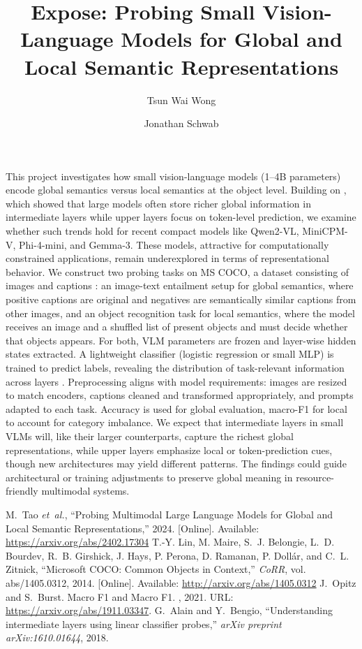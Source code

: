 \documentclass[12pt,a4paper]{article}
\title{\textbf{Expose: Probing Small Vision-Language Models for Global and Local Semantic Representations}}
\author{Tsun Wai Wong \and Jonathan Schwab}
\date{}
\begin{document}
\maketitle
\noindent
This project investigates how small vision-language models (1--4B parameters) encode global semantics versus local semantics at the object level. Building on \cite{tao2024probingmultimodallargelanguage}, which showed that large models often store richer global information in intermediate layers while upper layers focus on token-level prediction, we examine whether such trends hold for recent compact models like Qwen2-VL, MiniCPM-V, Phi-4-mini, and Gemma-3. These models, attractive for computationally constrained applications, remain underexplored in terms of representational behavior.
We construct two probing tasks on MS COCO, a dataset consisting of images and captions \cite{lin2014microsoft}: an image-text entailment setup for global semantics, where positive captions are original and negatives are semantically similar captions from other images, and an object recognition task for local semantics, where the model receives an image and a shuffled list of present objects and must decide whether that objects appears. For both, VLM parameters are frozen and layer-wise hidden states extracted. A lightweight classifier (logistic regression or small MLP) is trained to predict labels, revealing the distribution of task-relevant information across layers \cite{alain2018understanding}. Preprocessing aligns with model requirements: images are resized to match encoders, captions cleaned and transformed appropriately, and prompts adapted to each task. Accuracy is used for global evaluation, macro-F1 \cite{opitz2021macrof1} for local to account for category imbalance.
We expect that intermediate layers in small VLMs will, like their larger counterparts, capture the richest global representations, while upper layers emphasize local or token-prediction cues, though new architectures may yield different patterns. The findings could guide architectural or training adjustments to preserve global meaning in resource-friendly multimodal systems.

\begin{thebibliography}{1}
M.~Tao \emph{et~al.}, ``Probing Multimodal Large Language Models for Global and Local Semantic Representations,'' 2024. [Online]. Available: \url{https://arxiv.org/abs/2402.17304}
T.-Y. Lin, M. Maire, S.~J. Belongie, L.~D. Bourdev, R.~B. Girshick, J. Hays,
P. Perona, D. Ramanan, P. Doll{\'a}r, and C.~L. Zitnick,
``Microsoft COCO: Common Objects in Context,''
\emph{CoRR}, vol. abs/1405.0312, 2014. [Online]. Available: \url{http://arxiv.org/abs/1405.0312}
J.~Opitz and S.~Burst.
\newblock Macro F1 and Macro F1.
, 2021.
\newblock URL: \url{https://arxiv.org/abs/1911.03347}.
G.~Alain and Y.~Bengio,
\newblock ``Understanding intermediate layers using linear classifier probes,''
\newblock \emph{arXiv preprint arXiv:1610.01644}, 2018.
\end{thebibliography}
\end{document}
